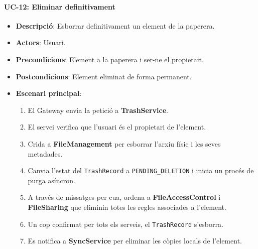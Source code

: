 \paragraph{UC-12: Eliminar definitivament}
\begin{itemize}
  \item \textbf{Descripció}: Esborrar definitivament un element de la paperera.
  \item \textbf{Actors}: Usuari.
  \item \textbf{Precondicions}: Element a la paperera i ser-ne el propietari.
  \item \textbf{Postcondicions}: Element eliminat de forma permanent.
  \item \textbf{Escenari principal}:
    \begin{enumerate}
        \item El Gateway envia la petició a \textbf{TrashService}.
        \item El servei verifica que l'usuari és el propietari de l'element.
        \item Crida a \textbf{FileManagement} per esborrar l'arxiu físic i les seves metadades.
        \item Canvia l'estat del \texttt{TrashRecord} a \texttt{PENDING\_DELETION} i inicia un procés de purga asíncron.
        \item A través de missatges per cua, ordena a \textbf{FileAccessControl} i \textbf{FileSharing} que eliminin totes les regles associades a l'element.
        \item Un cop confirmat per tots els serveis, el \texttt{TrashRecord} s'esborra.
        \item Es notifica a \textbf{SyncService} per eliminar les còpies locals de l'element.
    \end{enumerate}
\end{itemize}

